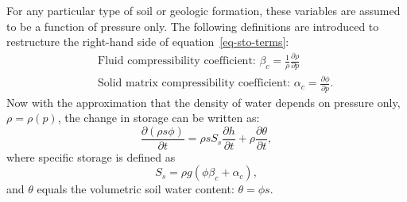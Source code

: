 \documentclass[fleqn]{article}
\begin{document}
For any particular type of soil or geologic formation, these variables
are assumed to be a function of pressure only. The following definitions
are introduced to restructure the right-hand side of
equation~\ref{eq-sto-terms}:
\begin{eqnarray*}
  &&\text{Fluid compressibility coefficient: }
    \beta_c = \frac{1}{\rho} \frac{\partial \rho}{\partial p} \\
  &&\text{Solid matrix compressibility coefficient: }
    \alpha_c = \frac{\partial \phi}{\partial p}.
\end{eqnarray*}
Now with the approximation that the density of water depends on
pressure only, $\rho = \rho(p)$, the change in storage can be written
as:
\begin{equation}
  \frac{\partial (\rho s \phi)}{\partial t} =
  \rho s S_s \frac{\partial h}{\partial t} +
  \rho \frac{\partial \theta}{\partial t},
  \label{eq-sto}
\end{equation}
where specific storage is defined as
\begin{equation}
  S_s = \rho g \left( \phi \beta_c + \alpha_c \right),
\end{equation}
and $\theta$ equals the volumetric soil water content: $\theta = \phi s$.
\end{document}
